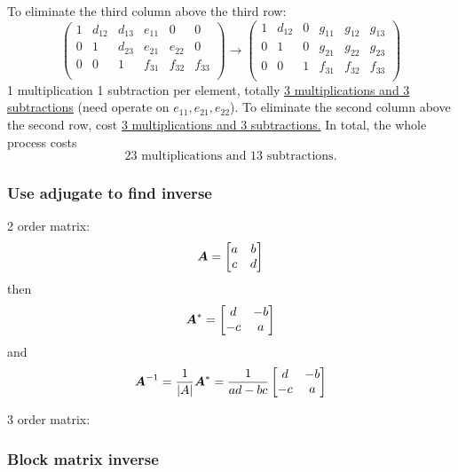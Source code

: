 \documentclass{overview}
\begin{document}
To eliminate the third column above the third row:
 \[
	 \left( \begin{array}{ccc|ccc}
			 1 & d_{12} & d_{13} &  e_{11} & 0 & 0 \\
			 0 & 1      & d_{23} &  e_{21} & e_{22} & 0 \\
			 0 & 0      & 1			&  f_{31} & f_{32} & f_{33} \\
		 \end{array}\right) \rightarrow
	 \left( \begin{array}{ccc|ccc}
			 1 & d_{12} & 0 &  g_{11} & g_{12} & g_{13} \\
			 0 & 1      & 0 &  g_{21} & g_{22} & g_{23} \\
			 0 & 0      & 1 &  f_{31} & f_{32} & f_{33} \\
	 \end{array}\right)
 \]
1 multiplication 1 subtraction per element, totally \underline{3 multiplications and 3 subtractions}
(need operate on $ e_{11}, e_{21}, e_{22} $).
To eliminate the second column above the second row, cost \underline{3 multiplications and 3 subtractions.}
In total, the whole process costs
\[
	\boxed{
	23 \text{ multiplications and } 13 \text{ subtractions.}
}
\]

\subsubsection{Use adjugate to find inverse}

2 order matrix:
\[
\boldsymbol{A}=\begin{bmatrix}
	a & b \\
	c & d \\
\end{bmatrix}
\]
then
\[
	\boldsymbol{A}^{*} =\begin{bmatrix}
	d & -b \\
	-c & a \\
	\end{bmatrix}
\]
and
\[
	\boldsymbol{A}^{-1} = \frac{1}{|A|}\boldsymbol{A}^{*} =
	\frac{1}{ad-bc}\begin{bmatrix}
	d & -b \\
	-c & a \\
	\end{bmatrix}
\] 

3 order matrix:

\subsubsection{Block matrix inverse}
\end{document}
